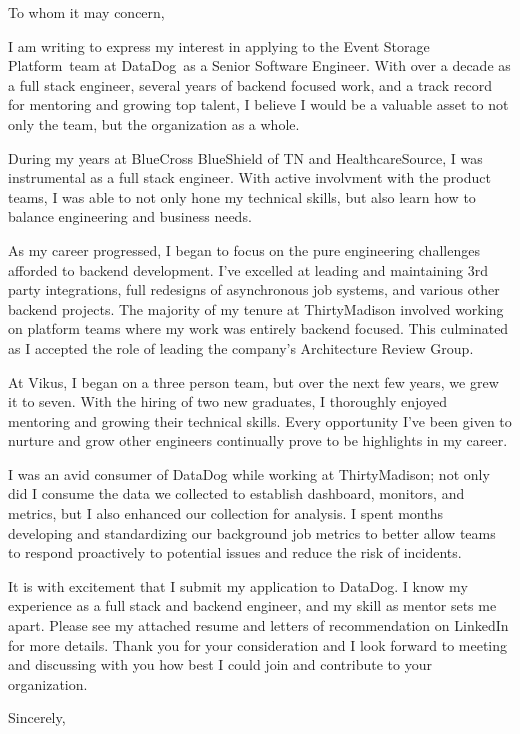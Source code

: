 
\usepackage{parskip}

\newcommand{\applyteam}{Event Storage Platform}
\newcommand{\applycompany}{DataDog}
\newcommand{\applyrole}{Senior Software Engineer}





To whom it may concern,

I am writing to express my interest in applying to the \applyteam\ team at \applycompany\ as a \applyrole.
With over a decade as a full stack engineer, several years of backend focused work, and a track record for
mentoring and growing top talent, I believe I would be a valuable asset to not only the team, but the
organization as a whole.

During my years at BlueCross BlueShield of TN and HealthcareSource, I was instrumental as a full stack
engineer. With active involvment with the product teams, I was able to not only hone my technical skills,
but also learn how to balance engineering and business needs.

As my career progressed, I began to focus on the pure engineering challenges afforded
to backend development. I've excelled at leading and maintaining 3rd party integrations, full redesigns of
asynchronous job systems, and various other backend projects. The majority of my tenure at ThirtyMadison
involved working on platform teams where my work was entirely backend focused. This culminated as I accepted
the role of leading the company's Architecture Review Group.

At Vikus, I began on a three person team, but over the next few years, we grew it to seven. With the hiring 
of two new graduates, I thoroughly enjoyed mentoring and growing their technical skills. Every opportunity
I've been given to nurture and grow other engineers continually prove to be highlights in my career.

I was an avid consumer of DataDog while working at ThirtyMadison; not only did I consume the data
we collected to establish dashboard, monitors, and metrics, but I also enhanced our collection for analysis.
I spent months developing and standardizing our background job metrics to better allow teams to
respond proactively to potential issues and reduce the risk of incidents.

It is with excitement that I submit my application to \applycompany. I know my experience as a
full stack and backend engineer, and my skill as mentor sets me apart. Please see my attached resume and
letters of recommendation on LinkedIn for more details. Thank you for your consideration and I look forward
to meeting and discussing with you how best I could join and contribute to your organization.

\hfill \break
Sincerely,\\
\name

